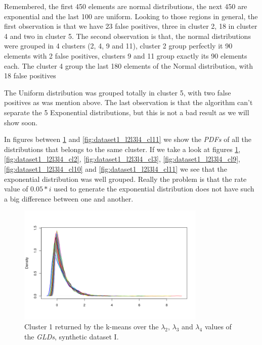 Remembered, the first 450 elements are normal distributions, the next 450 are exponential and the last 100 are uniform. Looking to those regions in general, the first observation is that we have 23 false positives, three in cluster 2, 18 in cluster 4 and two in cluster 5. The second observation is that, the normal distributions were grouped in 4 clusters (2, 4, 9 and 11), cluster 2 group perfectly it 90 elements with 2 false positives, clusters 9 and 11 group exactly its 90 elements each. The cluster 4 group the last 180 elements of the Normal distribution, with 18 false positives

The Uniform distribution was grouped totally in cluster 5, with two false positives as was mention above. The last observation is that the algorithm can't separate the 5 Exponential distributions, but this is not a bad result as we will show soon. 

In figures between \ref{fig:dataset1_l2l3l4_cl1} and \ref{fig:dataset1_l2l3l4_cl11} we show the \textit{PDFs} of all the distributions that belongs to the same cluster. If we take a look at figures \ref{fig:dataset1_l2l3l4_cl1}, \ref{fig:dataset1_l2l3l4_cl2}, \ref{fig:dataset1_l2l3l4_cl3}, \ref{fig:dataset1_l2l3l4_cl9}, \ref{fig:dataset1_l2l3l4_cl10} and \ref{fig:dataset1_l2l3l4_cl11} we see that the exponential distribution was well grouped. Really the problem is that the rate value of $0.05*i$ used to generate the exponential distribution does not have such a big difference between one and another.  

\begin{figure}[H]
    \centering
    \includegraphics[width=0.8\textwidth]{img/gld_clustering/Dataset1/l2_l3_l4/intento_3/cluster1.png}
    \caption{Cluster 1 returned by the k-means over the $\lambda_{2}$, $\lambda_{3}$ and $\lambda_{4}$ values of the \textit{GLDs}, synthetic dataset I.}
    \label{fig:dataset1_l2l3l4_cl1}
\end{figure}

